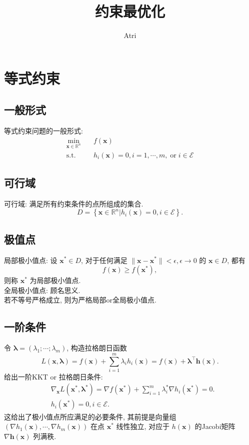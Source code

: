\documentclass[lang = cn]{elegantpaper}
\title{约束最优化}
\author{Atri}
\begin{document}
\maketitle
\section{等式约束}
\subsection{一般形式}
\noindent
等式约束问题的一般形式:
\begin{equation*}
\begin{aligned}
    \min_{\bm{x}\in\mathbb{R}^n} \quad &f(\bm{x})\\
    \mathrm{s.t.}\quad &h_i(\bm{x})=0,i=1,\cdots,m,\operatorname{or}i\in \mathcal{E} 
\end{aligned}
\end{equation*}
\subsection{可行域}
\noindent
可行域: 满足所有约束条件的点所组成的集合.
\begin{equation*}
    D = \left\{\bm{x}\in\mathbb{R}^n|h_i(\bm{x})=0,i\in \mathcal{E}\right\}.
\end{equation*}
\subsection{极值点}
\noindent
局部极小值点: 设 $\bm{x}^{*} \in D$, 对于任何满足 $\|\bm{x}-\bm{x}^{*}\| < \epsilon, \epsilon \rightarrow 0$ 的 $\bm{x} \in D$, 都有
\begin{equation*}
    f(\bm{x}) \ge f(\bm{x}^{*}),
\end{equation*}
则称 $\bm{x}^{*}$ 为局部极小值点.\\
全局极小值点: 顾名思义.\\
若不等号严格成立, 则为严格局部or全局极小值点.
\subsection{一阶条件}
\noindent
令 $\bm{\lambda} = (\lambda_1;\cdots;\lambda_m)$, 构造拉格朗日函数
\begin{equation*}
    L(\bm{x},\bm{\lambda})=f(\bm{x}) + \sum_{i=1}^m \lambda_i h_i(\bm{x}) = f(\bm{x}) + \bm{\lambda}^\top \bm{h}(\bm{x}).
\end{equation*}
给出一阶KKT or 拉格朗日条件:
\begin{equation*}
\begin{aligned}
    &\nabla_{\bm{x}} L(\bm{x}^{*},\bm{\lambda}^{*}) = \nabla f(\bm{x}^{*}) + \sum_{i=1}^m \lambda_i^{*}\nabla h_i(\bm{x}^{*}) = 0.\\
    &h_i(\bm{x}^{*})=0, i \in \mathcal{E}.
\end{aligned}
\end{equation*}
这给出了极小值点所应满足的必要条件, 其前提是向量组 $(\nabla h_1(\bm{x}),\cdots,\nabla h_m(\bm{x}))$ 在点 $\bm{x}^{*}$ 线性独立, 对应于 $h(\bm{x})$ 的Jacobi矩阵 $\nabla \bm{h}(\bm{x})$ 列满秩.
\end{document}
